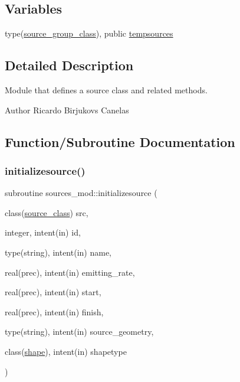 \subsection*{Variables}
\begin{DoxyCompactItemize}
\item 
type(\mbox{\hyperlink{structsources__mod_1_1source__group__class}{source\+\_\+group\+\_\+class}}), public \mbox{\hyperlink{namespacesources__mod_ab04ea8c02cdf83a1a356c8710ae811d5}{tempsources}}
\end{DoxyCompactItemize}


\subsection{Detailed Description}
Module that defines a source class and related methods. 

\begin{DoxyAuthor}{Author}
Ricardo Birjukovs Canelas 
\end{DoxyAuthor}


\subsection{Function/\+Subroutine Documentation}
\mbox{\label{namespacesources__mod_a6dcf7a3e3ccf75e01853df166231d484}} 
\subsubsection{\texorpdfstring{initializesource()}{initializesource()}}
{\footnotesize\ttfamily subroutine sources\+\_\+mod\+::initializesource (\begin{DoxyParamCaption}\item[{class(\mbox{\hyperlink{structsources__mod_1_1source__class}{source\+\_\+class}})}]{src,  }\item[{integer, intent(in)}]{id,  }\item[{type(string), intent(in)}]{name,  }\item[{real(prec), intent(in)}]{emitting\+\_\+rate,  }\item[{real(prec), intent(in)}]{start,  }\item[{real(prec), intent(in)}]{finish,  }\item[{type(string), intent(in)}]{source\+\_\+geometry,  }\item[{class(\mbox{\hyperlink{structgeometry__mod_1_1shape}{shape}}), intent(in)}]{shapetype }\end{DoxyParamCaption})\hspace{0.3cm}{\ttfamily [private]}}



